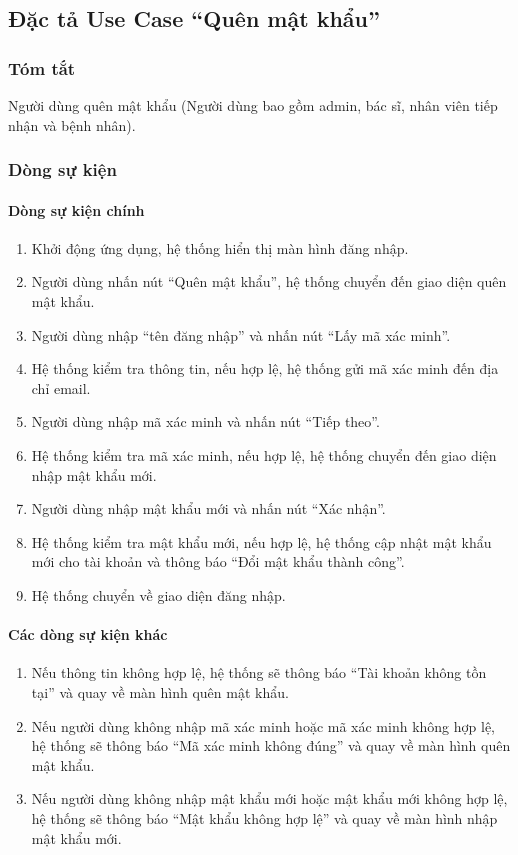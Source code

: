 \subsection{Đặc tả Use Case ``Quên mật khẩu''}

\subsubsection{Tóm tắt}
Người dùng quên mật khẩu (Người dùng bao gồm admin, bác sĩ, nhân viên tiếp nhận và bệnh nhân).

\subsubsection{Dòng sự kiện}
\paragraph{\textbf{Dòng sự kiện chính}}
\begin{enumerate}
    \item Khởi động ứng dụng, hệ thống hiển thị màn hình đăng nhập.
    \item Người dùng nhấn nút ``Quên mật khẩu'', hệ thống chuyển đến giao diện quên mật khẩu.
    \item Người dùng nhập ``tên đăng nhập'' và nhấn nút ``Lấy mã xác minh''.
    \item Hệ thống kiểm tra thông tin, nếu hợp lệ, hệ thống gửi mã xác minh đến địa chỉ email.
    \item Người dùng nhập mã xác minh và nhấn nút ``Tiếp theo''.
    \item Hệ thống kiểm tra mã xác minh, nếu hợp lệ, hệ thống chuyển đến giao diện nhập mật khẩu mới.
    \item Người dùng nhập mật khẩu mới và nhấn nút ``Xác nhận''.
    \item Hệ thống kiểm tra mật khẩu mới, nếu hợp lệ, hệ thống cập nhật mật khẩu mới cho tài khoản và thông báo ``Đổi mật khẩu thành công''.
    \item Hệ thống chuyển về giao diện đăng nhập.
\end{enumerate}

\paragraph{\textbf{Các dòng sự kiện khác}}
\begin{enumerate}
    \item Nếu thông tin không hợp lệ, hệ thống sẽ thông báo ``Tài khoản không tồn tại'' và quay về màn hình quên mật khẩu.
    \item Nếu người dùng không nhập mã xác minh hoặc mã xác minh không hợp lệ, hệ thống sẽ thông báo ``Mã xác minh không đúng'' và quay về màn hình quên mật khẩu.
    \item Nếu người dùng không nhập mật khẩu mới hoặc mật khẩu mới không hợp lệ, hệ thống sẽ thông báo ``Mật khẩu không hợp lệ'' và quay về màn hình nhập mật khẩu mới.
\end{enumerate}

